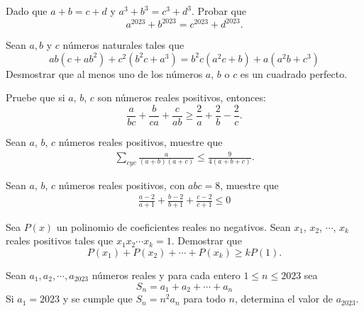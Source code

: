 \begin{section-problem}
    Dado que $a + b = c + d$ y $a^3 + b^3 = c^3 + d^3$.
    Probar que
    \[a^{2023} + b^{2023} = c^{2023} + d^{2023}.\]
\end{section-problem}

\begin{section-problem}
    Sean $a, b$ y $c$ números naturales tales que
    \[ab(c + ab^2) + c^2(b^{2} c + a^3) = b^2 c(a^2 c + b) + a(a^2 b + c^3)\]
    Desmostrar que al menos uno de los números $a$, $b$ o $c$ es un cuadrado perfecto.
\end{section-problem}

\begin{section-problem}
    Pruebe que si $a$, $b$, $c$ son números reales positivos, entonces:
    \[\frac{a}{bc} + \frac{b}{ca} + \frac{c}{ab} \geq \frac{2}{a} + \frac{2}{b} - \frac{2}{c}.\]
\end{section-problem}

\begin{section-problem}
    Sean $a$, $b$, $c$ números reales positivos, muestre que
    \begin{gather*}
        \sum_{cyc} \frac{a}{(a + b)(a + c)} \leq \frac{9}{4(a + b + c)}.
    \end{gather*}
\end{section-problem}

\begin{section-problem}
    Sean $a$, $b$, $c$ números reales positivos, con $abc = 8$, muestre que
    \begin{gather*}
        \frac{a - 2}{a + 1} +
        \frac{b - 2}{b + 1} +
        \frac{c - 2}{c + 1} \leq 0
    \end{gather*}
\end{section-problem}

\begin{section-problem}
    Sea $P(x)$ un polinomio de coeficientes reales no negativos.
    Sean $x_1$, $x_2$, $\cdots$, $x_k$ reales positivos tales que $x_1 x_2 \cdots x_k = 1$.
    Demostrar que
    \[P(x_1) + P(x_2) + \cdots + P(x_k) \geq kP(1).\]
\end{section-problem}

\begin{section-problem}
    Sean $a_1, a_2, \cdots, a_{2023}$ números reales y para cada entero $1 \leq n \leq 2023$ sea
    \[S_n = a_1 + a_2 + \cdots + a_n\]
    Si $a_1 = 2023$ y se cumple que $S_n =  n^2 a_n$ para todo $n$, determina el valor de $a_{2023}$.
\end{section-problem}

